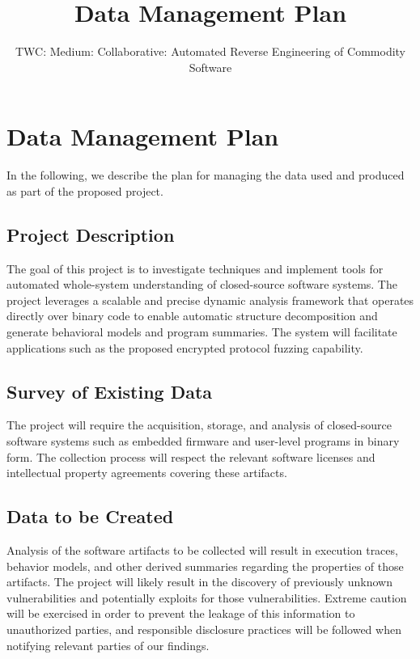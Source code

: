 \documentclass[letterpaper,twoside,11pt,headings=small]{scrartcl}
\newcommand{\thetitle}{TWC: Medium: Collaborative: Automated Reverse Engineering of Commodity Software\xspace}
\begin{document}
\title{Data Management Plan}
\subtitle{\thetitle}
\author{}
\date{}
\maketitle

\section{Data Management Plan}
\label{sec:dmp}

In the following, we describe the plan for managing the data used and produced
as part of the proposed project.

\subsection{Project Description}
\label{sec:dmp:desc}

The goal of this project is to investigate techniques and implement tools for
automated whole-system understanding of closed-source software systems.  The
project leverages a scalable and precise dynamic analysis framework that operates
directly over binary code to enable automatic structure decomposition and generate
behavioral models and program summaries.  The system will facilitate applications
such as the proposed encrypted protocol fuzzing capability.

\subsection{Survey of Existing Data}
\label{sec:dmp:survey}

The project will require the acquisition, storage, and analysis of closed-source
software systems such as embedded firmware and user-level programs in binary form.
The collection process will respect the relevant software licenses and intellectual
property agreements covering these artifacts.

\subsection{Data to be Created}
\label{sec:dmp:created}

Analysis of the software artifacts to be collected will result in execution
traces, behavior models, and other derived summaries regarding the properties
of those artifacts.  The project will likely result in the discovery of
previously unknown vulnerabilities and potentially exploits for those
vulnerabilities.  Extreme caution will be exercised in order to prevent the
leakage of this information to unauthorized parties, and responsible
disclosure practices will be followed when notifying relevant parties of our
findings.
\end{document}

